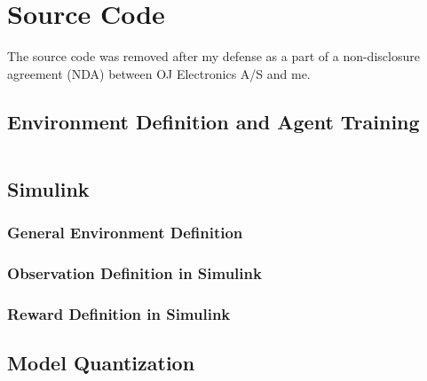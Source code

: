 \documentclass[../main.tex]{subfiles}
\begin{document}
\chapter{Source Code} \label{chap:apa}
The source code was removed after my defense as a part of a non-disclosure agreement (NDA) between OJ Electronics A/S and me.

\section{Environment Definition and Agent Training}
\begin{lstlisting}[language=Matlab,breaklines=true]

\end{lstlisting}

\section{Simulink}
\subsection{General Environment Definition}

\subsection{Observation Definition in Simulink}

\subsection{Reward Definition in Simulink}

\section{Model Quantization}
\begin{lstlisting}[language=Matlab,breaklines=true]

\end{lstlisting}
\end{document}
